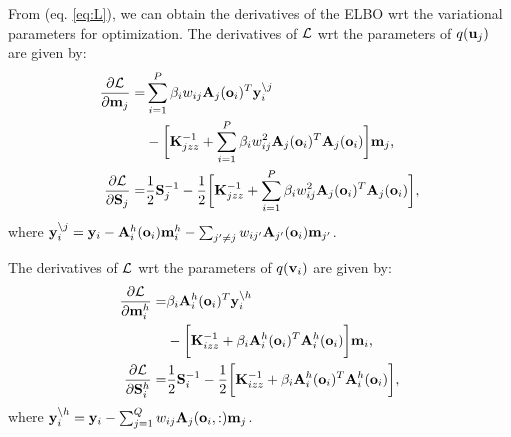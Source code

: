\newcommand{\Lgj}{\calL^g_j}
\newcommand{\ynoj}{\y_i^{\backslash j}}
\newcommand{\Kjzz}{\mat{K}_{jzz}}
From (eq. \ref{eq:L}), we can obtain the derivatives of the ELBO wrt the variational parameters for optimization.
The derivatives of $\mathcal{L}$ wrt the parameters of $q(\mathbf{u}_j)$ are given by:
\begin{align}
\deriv{\calL}{\m_j} 
=& \sum_{i=1}^P \beta_i w_{ij} \A_j(\oi)^T \ynoj \\
\nonumber
&- \bigg[\Kjzz^{-1} + \sum_{i=1}^P \beta_i w_{ij}^2 \A_j(\oi)^T \A_j(\oi) \bigg] \m_j \text{,} \\
\deriv{\calL}{\S_j} 
=& \frac{1}{2} \S_j^{-1} - \frac{1}{2} \bigg[ \Kjzz^{-1} + \sum_{i=1}^P \beta_i w_{ij}^2 \A_j(\oi)^T \A_j(\oi) \bigg],
\end{align}
where $\mathbf{y}_i^{\backslash j} = \mathbf{y}_i - \mathbf{A}^h_i(\mathbf{o}_i) \mathbf{m}^h_i - \sum_{j' \neq j} w_{ij'} \mathbf{A}_{j'}(\mathbf{o}_i) \mathbf{m}_{j'}$.

\newcommand{\Lhi}{\calL^h_i}
\newcommand{\Kizz}{\mat{K}_{izz}}
\noindent The derivatives of $\mathcal{L}$ wrt the parameters of $q(\mathbf{v}_i)$ are given by:
\newcommand{\ynoh}{\y_i^{\backslash h}}
\begin{align}
\nonumber
\deriv{\calL}{\mhi}
= & \beta_i \Ahi(\oi)^T \ynoh  \\
&- \bigg[\Kizz^{-1} +  \beta_i \Ahi(\oi)^T \Ahi(\oi) \bigg] \m_i \text{,} \\
\deriv{\calL}{\Shi} 
=& \frac{1}{2} \S_i^{-1} - \frac{1}{2} \bigg[ \Kizz^{-1} + \beta_i \Ahi(\oi)^T \Ahi(\oi) \bigg] ,
\end{align}
where $\ynoh = \y_i - \sum_{j=1}^Q w_{ij} \A_j(\oi,:) \m_j$.

